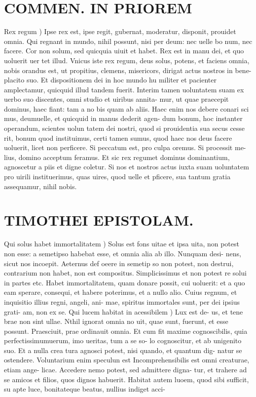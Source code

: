 \documentclass{article}
\begin{document}
\begin{pages}
\section*{COMMEN. IN PRIOREM }
\marginpar{[ p.176 ]}\pstart Rex regum ) Ipse rex est, ipse regit, gubernat, moderatur, disponit, prouidet omnia. Qui regnant in mundo, nihil possunt, nisi per deum: nec uelle bo num, nec facere. Cor non solum, sed quicquia uiuit et habet. Rex est in manu dei, et quo uoluerit uer tet illud. Vnicus iste rex regum, deus solus, potens, et faciens omnia, nobis orandus est, ut propitius, clemens, misericors, dirigat actus nostros in bene- placito suo. Et dispositionem dei in hoc mundo hu militer et pacienter amplectamur, quicquid illud tandem fuerit. Interim tamen uoluntatem suam ex uerbo suo discentes, omni studio et uiribus annita- mur, ut quae praecepit dominus, haec fiant: tam a no bis quam ab aliis. Haec enim nos debere conari sci mus, deumuelle, et quicquid in manus dederit agen- dum bonum, hoc instanter operandum, scientes uolun tatem dei nostri, quod si prouidentia sua secus cesse rit, bonum quod instituimus, certi tamen sumus, quod haec nos deus facere uoluerit, licet non perficere. Si peccatum est, pro culpa oremus. Si processit me- lius, domino acceptum feramus. Et sic rex regumet dominus dominantium, agnoscetur a piis et digne coletur. Si nos et nostros actus iuxta suam uoluntatem pro uirili instituerimus, quas uires, quod uelle et pficere, sua tantum gratia assequamur, nihil nobis.  \pend
\section*{TIMOTHEI EPISTOLAM. }
\marginpar{[ p.177 ]}\pstart Qui solus habet immortalitatem ) Solus est fons uitae et ipsa uita, non potest non esse: a semetipso habebat esse, et omnia alia ab illo. Nunquam desi- nens, sicut nos incoepit. Aeternus def oeere in semetip so non potest, non destrui, contrarium non habet, non est compositus. Simplicissimus et non potest re solui in partes etc. Habet immortalitatem, quam donare possit, cui uoluerit: et a quo eam sperare, consequi, et habere poterimus, et a nullo alio. Cuius regnum, et inquisitio illius regni, angeli, ani- mae, spiritus immortales sunt, per dei ipsius grati- am, non ex se.  \pend\pstart Qui lucem habitat in acessibilem ) Lux est de- us, et tene brae non sint ullae. Nthil ignorat omnia no uit, quae sunt, fuerunt, et esse possunt. Praesciuit, prae ordinauit omnia. Et cum fit maxime cognoscibilis, quia perfectissimumuerum, imo ueritas, tum a se so- lo cognoscitur, et ab unigenito suo. Et a nulla crea tura agnosci potest, nisi quando, et quantum dig- natur se ostendere. Voluntarium enim speculun est Incomprehensibilis est omni creaturae, etiam ange- licae. Accedere nemo potest, sed admittere digna- tur, et trahere ad se amicos et filios, quos dignos habuerit. Habitat autem luoem, quod sibi sufficit, su apte luce, bonitateque beatus, nullius indiget acci-  \pend

\end{pages}
\end{document}
